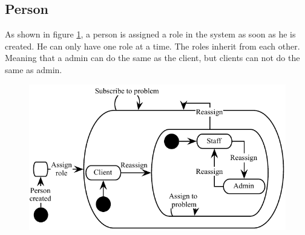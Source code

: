 \subsection{Person}
As shown in figure \ref{fig:Klasse_diagram_person}, a person is assigned a role in the system as soon as he is created. 
He can only have one role at a time. 
The roles inherit from each other. 
Meaning that a admin can do the same as the client, but clients can not do the same as admin. 
\begin{figure}[H]
\begin{center}
\includegraphics[scale=1]{input/problem_domain_analysis/Klassediagram_person.pdf}
\label{fig:Klasse_diagram_person}
\end{center}
\end{figure}
